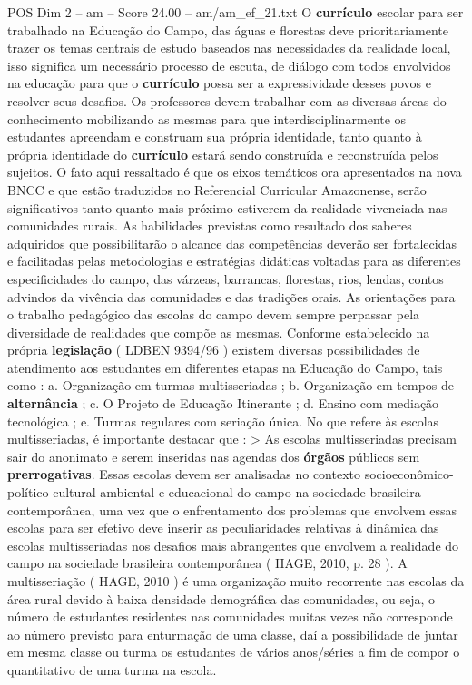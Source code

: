 \begin{textsample}{POS Dim 2 – am – Score 24.00 – am/am\_ef\_21.txt}
O \textbf{currículo} escolar para ser trabalhado na Educação do Campo, das águas e florestas deve prioritariamente trazer os temas centrais de estudo baseados nas necessidades da realidade local, isso significa um necessário processo de escuta, de diálogo com todos envolvidos na educação para que o \textbf{currículo} possa ser a expressividade desses povos e resolver seus desafios.
Os professores devem trabalhar com as diversas áreas do conhecimento mobilizando as mesmas para que interdisciplinarmente os estudantes apreendam e construam sua própria identidade, tanto quanto à própria identidade do \textbf{currículo} estará sendo construída e reconstruída pelos sujeitos.
O fato aqui ressaltado é que os eixos temáticos ora apresentados na nova BNCC e que estão traduzidos no Referencial Curricular Amazonense, serão significativos tanto quanto mais próximo estiverem da realidade vivenciada nas comunidades rurais.
As habilidades previstas como resultado dos saberes adquiridos que possibilitarão o alcance das competências deverão ser fortalecidas e facilitadas pelas metodologias e estratégias didáticas voltadas para as diferentes especificidades do campo, das várzeas, barrancas, florestas, rios, lendas, contos advindos da vivência das comunidades e das tradições orais.
As orientações para o trabalho pedagógico das escolas do campo devem sempre perpassar pela diversidade de realidades que compõe as mesmas.
Conforme estabelecido na própria \textbf{legislação} ( LDBEN 9394/96 ) existem diversas possibilidades de atendimento aos estudantes em diferentes etapas na Educação do Campo, tais como : a.
Organização em turmas multisseriadas ; b.
Organização em tempos de \textbf{alternância} ; c.
O Projeto de Educação Itinerante ; d.
Ensino com mediação tecnológica ; e.
Turmas regulares com seriação única.
No que refere às escolas multisseriadas, é importante destacar que : > As escolas multisseriadas precisam sair do anonimato e serem inseridas nas agendas dos \textbf{órgãos} públicos sem \textbf{prerrogativas}.
Essas escolas devem ser analisadas no contexto socioeconômico-político-cultural-ambiental e educacional do campo na sociedade brasileira contemporânea, uma vez que o enfrentamento dos problemas que envolvem essas escolas para ser efetivo deve inserir as peculiaridades relativas à dinâmica das escolas multisseriadas nos desafios mais abrangentes que envolvem a realidade do campo na sociedade brasileira contemporânea ( HAGE, 2010, p. 28 ).
A multisseriação ( HAGE, 2010 ) é uma organização muito recorrente nas escolas da área rural devido à baixa densidade demográfica das comunidades, ou seja, o número de estudantes residentes nas comunidades muitas vezes não corresponde ao número previsto para enturmação de uma classe, daí a possibilidade de juntar em mesma classe ou turma os estudantes de vários anos/séries a fim de compor o quantitativo de uma turma na escola.

\end{textsample}
